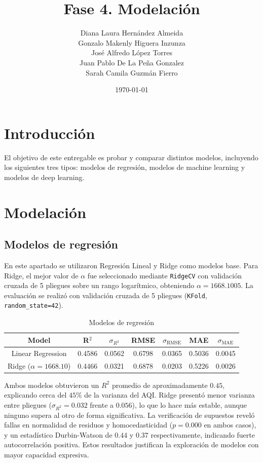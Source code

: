 \documentclass{article}
\title{Fase 4. Modelación}
\author{
    Diana Laura Hernández Almeida \\
    Gonzalo Makenly Higuera Inzunza \\
    José Alfredo López Torres \\
    Juan Pablo De La Peña Gonzalez \\
    Sarah Camila Guzmán Fierro
}
\date{\today}
\begin{document}
\maketitle
\section{Introducción}
El objetivo de este entregable es probar y comparar distintos modelos, incluyendo los siguientes
tres tipos: modelos de regresión, modelos de machine learning y modelos de deep learning. 
\section{Modelación}
\subsection{Modelos de regresión}
En este apartado se utilizaron Regresión Lineal y Ridge como modelos base. Para Ridge, el mejor valor de $\alpha$ fue seleccionado mediante \texttt{RidgeCV} con validación cruzada de 5 pliegues sobre un rango logarítmico, obteniendo $\alpha = 1668.1005$. La evaluación se realizó con validación cruzada de 5 pliegues (\texttt{KFold}, \texttt{random\_state=42}).

\begin{table}[ht]
\caption{Modelos de regresión}
\centering
\begin{tabular}{c c c c c c c}
\hline\hline
    Model & R$^2$ & $\sigma_{R^2}$ & RMSE & $\sigma_{\text{RMSE}}$ & MAE & $\sigma_{\text{MAE}}$ \\ [0.5ex]
\hline
    Linear Regression & 0.4586 & 0.0562 & 0.6798 & 0.0365 & 0.5036 & 0.0045 \\
    Ridge ($\alpha=1668.10$) & 0.4466 & 0.0321 & 0.6878 & 0.0203 & 0.5226 & 0.0026 \\ [1ex]
\hline
\end{tabular}
\end{table}

Ambos modelos obtuvieron un $R^2$ promedio de aproximadamente $0.45$, explicando cerca del $45\%$ de la varianza del AQI. Ridge presentó menor varianza entre pliegues ($\sigma_{R^2} = 0.032$ frente a $0.056$), lo que lo hace más estable, aunque ninguno supera al otro de forma significativa. La verificación de supuestos reveló fallas en normalidad de residuos y homocedasticidad ($p = 0.000$ en ambos casos), y un estadístico Durbin-Watson de $0.44$ y $0.37$ respectivamente, indicando fuerte autocorrelación positiva. Estos resultados justifican la exploración de modelos con mayor capacidad expresiva.
\end{document}
